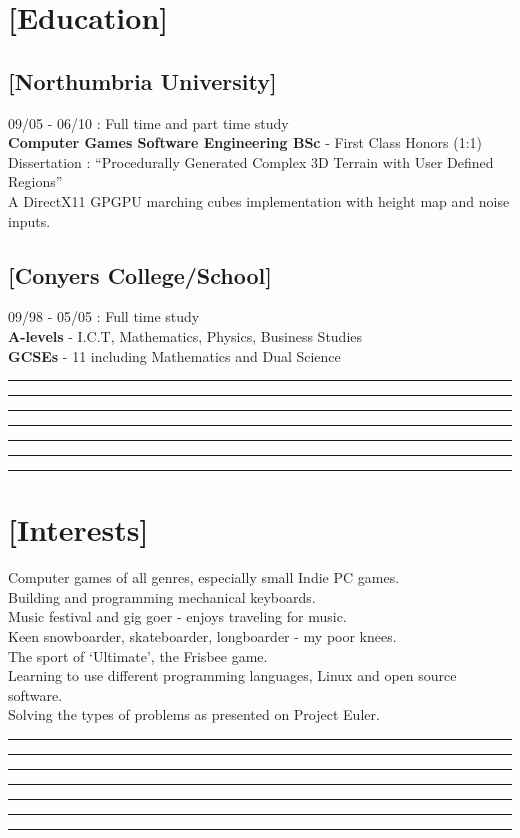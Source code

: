 \documentclass[a4paper]{res}
\newcommand{\setrule}[1]{\rule{#1}{1mm}}
\newcommand{\fibrule}[2]{ \hspace{#1}  \setrule{#2} \setrule{21mm} \setrule{13mm} \setrule{8mm} \setrule{5mm} \setrule{3mm} \setrule{2mm}  \vspace{-.52in} }
\begin{document}
\begin{resume}
\section{[Education]} 

\vspace{-.12in}

\subsection{[Northumbria University]} 09/05 - 06/10 : Full time and part time study\\
{\bf Computer Games Software Engineering BSc} -  First Class Honors (1:1) \\
Dissertation : ``Procedurally Generated Complex 3D Terrain with User Defined Regions'' \\
A DirectX11 GPGPU marching cubes implementation with height map and noise inputs.

\vspace{-.22in}

\subsection{[Conyers College/School]} 09/98 - 05/05 : Full time study\\
{\bf A-levels} - I.C.T, Mathematics, Physics, Business Studies \\
{\bf GCSEs} - 11 including  Mathematics and Dual Science 

\fibrule{0.9in}{3.0in}
\section{[Interests]} 

Computer games of all genres, especially small Indie PC games.\\
Building and programming mechanical keyboards.\\
Music festival and gig goer - enjoys traveling for music. \\
Keen snowboarder, skateboarder, longboarder - my poor knees. \\
The sport of `Ultimate', the Frisbee game. \\
Learning to use different programming languages, Linux and open source software.\\
Solving the types of problems as presented on Project Euler.

\fibrule{1.075in}{2.825in}

\end{resume}
\end{document}
